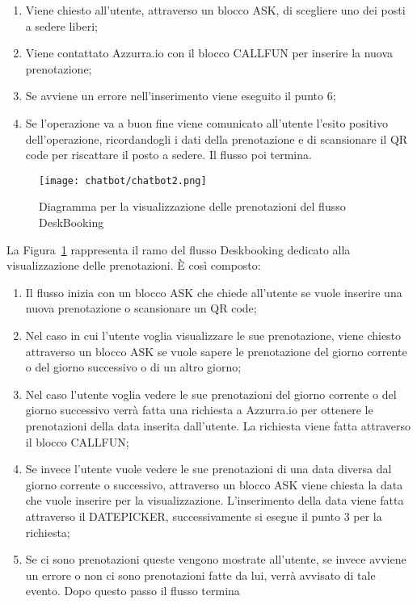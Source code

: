 \begin{enumerate}
	\item Viene chiesto all'utente, attraverso un blocco ASK, di scegliere uno dei posti a sedere liberi;
	\item Viene contattato Azzurra.io con il blocco CALLFUN per inserire la nuova prenotazione;
	\item Se avviene un errore nell'inserimento viene eseguito il punto 6;
	\item Se l'operazione va a buon fine viene comunicato all'utente l'esito positivo dell'operazione, ricordandogli i dati della prenotazione e di scansionare il \gls{QR code}\ap{[g]} per riscattare il posto a sedere. Il flusso poi termina.
\end{enumerate}

\begin{figure}[h]
	\centering
	\texttt{[image: chatbot/chatbot2.png]}
	\caption{Diagramma per la visualizzazione delle prenotazioni del flusso DeskBooking}\label{fig:vis}
\end{figure}

La Figura~\ref{fig:vis} rappresenta il ramo del flusso Deskbooking dedicato alla visualizzazione delle prenotazioni. È così composto:
\begin{enumerate}
	\item Il flusso inizia con un blocco ASK che chiede all'utente se vuole inserire una nuova prenotazione o scansionare un \gls{QR code}\ap{[g]};
	\item Nel caso in cui l'utente voglia visualizzare le sue prenotazione, viene chiesto attraverso un blocco ASK se vuole sapere le prenotazione del giorno corrente o del giorno successivo o di un altro giorno;
	\item Nel caso l'utente voglia vedere le sue prenotazioni del giorno corrente o del giorno successivo verrà fatta una richiesta a Azzurra.io per ottenere le prenotazioni della data inserita dall'utente. La richiesta viene fatta attraverso il blocco CALLFUN;
	\item Se invece l'utente vuole vedere le sue prenotazioni di una data diversa dal giorno corrente o successivo, attraverso un blocco ASK viene chiesta la data che vuole inserire per la visualizzazione. L'inserimento della data viene fatta attraverso il DATEPICKER, successivamente si esegue il punto 3 per la richiesta;
	\item Se ci sono prenotazioni queste vengono mostrate all'utente, se invece avviene un errore o non ci sono prenotazioni fatte da lui, verrà avvisato di tale evento. Dopo questo passo il flusso termina\\
\end{enumerate}

